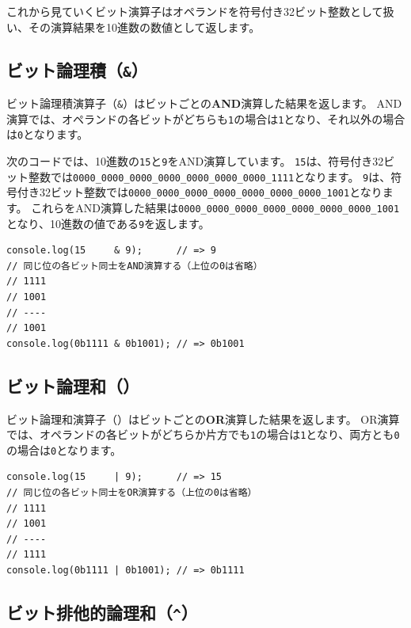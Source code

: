 これから見ていくビット演算子はオペランドを符号付き32ビット整数として扱い、その演算結果を10進数の数値として返します。

\hypertarget{bit-and}{%
\subsection{\texorpdfstring{ビット論理積（\texttt{\&}）}{ビット論理積（\&）}}\label{bit-and}}

ビット論理積演算子（\texttt{\&}）はビットごとの\textbf{AND}演算した結果を返します。
AND演算では、オペランドの各ビットがどちらも\texttt{1}の場合は\texttt{1}となり、それ以外の場合は\texttt{0}となります。

次のコードでは、10進数の\texttt{15}と\texttt{9}をAND演算しています。
\texttt{15}は、符号付き32ビット整数では\texttt{0000\_0000\_0000\_0000\_0000\_0000\_0000\_1111}となります。
\texttt{9}は、符号付き32ビット整数では\texttt{0000\_0000\_0000\_0000\_0000\_0000\_0000\_1001}となります。
これらをAND演算した結果は\texttt{0000\_0000\_0000\_0000\_0000\_0000\_0000\_1001}となり、10進数の値である\texttt{9}を返します。

\begin{lstlisting}
console.log(15     & 9);      // => 9
// 同じ位の各ビット同士をAND演算する（上位の0は省略）
// 1111
// 1001
// ----
// 1001
console.log(0b1111 & 0b1001); // => 0b1001
\end{lstlisting}

\hypertarget{bit-or}{%
\subsection{\texorpdfstring{ビット論理和（\texttt{\textbar{}}）}{ビット論理和（\textbar{}）}}\label{bit-or}}

ビット論理和演算子（\texttt{\textbar{}}）はビットごとの\textbf{OR}演算した結果を返します。
OR演算では、オペランドの各ビットがどちらか片方でも\texttt{1}の場合は\texttt{1}となり、両方とも\texttt{0}の場合は\texttt{0}となります。

\begin{lstlisting}
console.log(15     | 9);      // => 15
// 同じ位の各ビット同士をOR演算する（上位の0は省略）
// 1111
// 1001
// ----
// 1111
console.log(0b1111 | 0b1001); // => 0b1111
\end{lstlisting}

\hypertarget{bit-xor}{%
\subsection{\texorpdfstring{ビット排他的論理和（\texttt{\^{}}）}{ビット排他的論理和（\^{}）}}\label{bit-xor}}

